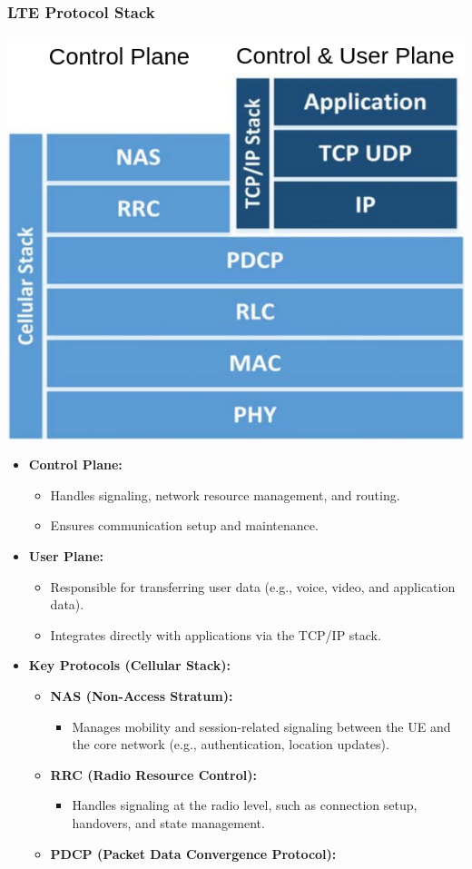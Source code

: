 \subsubsection{LTE Protocol Stack}
\includegraphics[width=0.3\columnwidth]{Resources/lte_protocols.png} %
\begin{itemize}
    \item \textbf{Control Plane:}
    \begin{itemize}
        \item Handles signaling, network resource management, and routing.
        \item Ensures communication setup and maintenance.
    \end{itemize}
    \item \textbf{User Plane:}
    \begin{itemize}
        \item Responsible for transferring user data (e.g., voice, video, and application data).
        \item Integrates directly with applications via the TCP/IP stack.
    \end{itemize}
    \item \textbf{Key Protocols (Cellular Stack):}
    \begin{itemize}
        \item \textbf{NAS (Non-Access Stratum):}
        \begin{itemize}
            \item Manages mobility and session-related signaling between the UE and the core network (e.g., authentication, location updates).
        \end{itemize}
        \item \textbf{RRC (Radio Resource Control):}
        \begin{itemize}
            \item Handles signaling at the radio level, such as connection setup, handovers, and state management.
        \end{itemize}
        \item \textbf{PDCP (Packet Data Convergence Protocol):}
        \begin{itemize}

\end{itemize}
\end{itemize}
\end{itemize}
